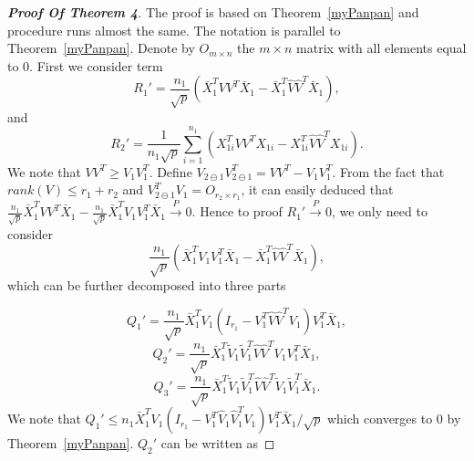 \begin{proof}[\textbf{Proof Of Theorem 4}]
    The proof is based on Theorem~\ref{myPanpan} and procedure runs almost the same. The notation is parallel to Theorem~\ref{myPanpan}. Denote by $O_{m\times n}$ the $m\times n$ matrix with all elements equal to $0$. First we consider term
\begin{equation*}
    R_1'=\frac{n_1}{\sqrt{p}}(\bar{X}_1^T VV^T\bar{X}_1-\bar{X}_1^T \hat{V}\hat{V}^T\bar{X}_1),
\end{equation*}
and
\begin{equation*}
    R_2'=\frac{1}{n_1\sqrt{p}}\sum_{i=1}^{n_1}(X_{1i}^T VV^T X_{1i}-X_{1i}^T \hat{V}\hat{V}^T X_{1i}).
\end{equation*}
We note that $VV^T\geq V_1 V_1^T$. Define $V_{2\ominus 1}V_{2\ominus 1}^T=VV^T-V_1 V_1^T$. From the fact that $rank(V)\leq r_1+r_2$ and $V_{2\ominus 1}^T V_1=O_{r_2\times r_1}$, it can easily deduced that $\frac{n_1}{\sqrt{p}}\bar{X}_1^T VV^T\bar{X}_1-\frac{n_1}{\sqrt{p}}\bar{X}_1^T V_1V_1^T\bar{X}_1\xrightarrow{P}0$. Hence to proof $R_1'\xrightarrow{P}0$, we only need to consider
\begin{equation*}
\frac{n_1}{\sqrt{p}}(\bar{X}_1^T V_1V_1^T \bar{X}_1-\bar{X}_1^T \hat{V}\hat{V}^T \bar{X}_1),
\end{equation*}
which can be further decomposed into three parts

    \begin{equation*}
        Q_1'=\frac{n_1}{\sqrt{p}}\bar{X}_1^T V_1(I_{r_1}-V_1^T\hat{V}\hat{V}^T V_1)V_1^T \bar{X}_1,
    \end{equation*}
    \begin{equation*}
        Q_2'=\frac{n_1}{\sqrt{p}}\bar{X}_1^T \tilde{V}_1\tilde{V}_1^T\hat{V}\hat{V}^T V_1V_1^T \bar{X}_1,
    \end{equation*}
    \begin{equation*}
        Q_3'=\frac{n_1}{\sqrt{p}}\bar{X}_1^T \tilde{V}_1\tilde{V}_1^T\hat{V}\hat{V}^T \tilde{V}_1\tilde{V}_1^T \bar{X}_1.
    \end{equation*}
We note that $Q_1'\leq n_1\bar{X}_1^T V_1(I_{r_1}-V_1^T\hat{V}_1\hat{V}_1^T V_1)V_1^T \bar{X}_1/\sqrt{p}$ which converges to $0$ by Theorem~\ref{myPanpan}.  $Q_2'$ can be written as


\end{proof}
